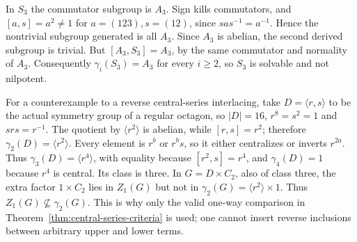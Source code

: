 In $S_3$ the commutator subgroup is $A_3$. Sign kills commutators, and
$[a,s]=a^2\ne1$ for $a=(123),s=(12)$, since $sas^{-1}=a^{-1}$.
Hence the nontrivial subgroup generated is all $A_3$.
Since $A_3$ is abelian, the second derived subgroup is trivial. But
$[A_3,S_3]=A_3$, by the same commutator and normality of $A_3$.
Consequently $\gamma_i(S_3)=A_3$ for every $i\geq2$, so $S_3$
is solvable and not nilpotent.

For a counterexample to a reverse central-series interlacing, take
$D=\langle r,s\rangle$ to be the actual symmetry group of a regular
octagon, so $|D|=16$, $r^8=s^2=1$ and $srs=r^{-1}$.
The quotient by $\langle r^2\rangle$ is abelian, while
$[r,s]=r^2$; therefore $\gamma_2(D)=\langle r^2\rangle$.
Every element is $r^b$ or $r^bs$, so it either centralizes or inverts
$r^{2a}$. Thus $\gamma_3(D)=\langle r^4\rangle$, with equality
because $[r^2,s]=r^4$, and $\gamma_4(D)=1$ because $r^4$ is
central. Its class is three. In $G=D\times C_2$, also of class three,
the extra factor $1\times C_2$ lies in $Z_1(G)$ but not in
$\gamma_2(G)=\langle r^2\rangle\times1$.
Thus $Z_1(G)\nsubseteq\gamma_2(G)$. This is why only the valid
one-way comparison in Theorem~\ref{thm:central-series-criteria} is used;
one cannot insert reverse inclusions between arbitrary upper and lower
terms.

